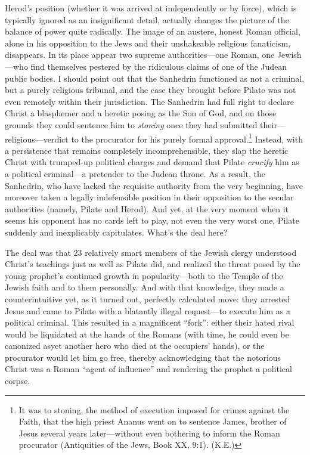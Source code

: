 Herod's position (whether it was arrived at independently or by force), which is typically ignored as an insignificant detail, actually changes the picture of the balance of power quite radically. The image of an austere, honest Roman official, alone in his opposition to the Jews and their unshakeable religious fanaticism, disappears. In its place appear two supreme authorities---one Roman, one Jewish---who find themselves pestered by the ridiculous claims of one of the Judean public bodies. I should point out that the Sanhedrin functioned as not a criminal, but a purely religious tribunal, and the case they brought before Pilate was not even remotely within their jurisdiction. The Sanhedrin had full right to declare Christ a blasphemer and a heretic posing as the Son of God, and on those grounds they could sentence him to \emph{stoning} once they had submitted their---religious---verdict to the procurator for his purely formal approval.\footnote{ It was to stoning, the method of execution imposed for crimes against the Faith, that the high priest Ananus went on to sentence James, brother of Jesus several years later---without even bothering to inform the Roman procurator (Antiquities of the Jews, Book XX, 9:1). (K.E.)} Instead, with a persistence that remains completely incomprehensible, they slap the heretic Christ with trumped-up political charges and demand that Pilate \emph{crucify} him as a political criminal---a pretender to the Judean throne. As a result, the Sanhedrin, who have lacked the requisite authority from the very beginning, have moreover taken a legally indefensible position in their opposition to the secular authorities (namely, Pilate and Herod). And yet, at the very moment when it seems his opponent has no cards left to play, not even the very worst one, Pilate suddenly and inexplicably capitulates. What's the deal here?

The deal was that 23 relatively smart members of the Jewish clergy understood Christ's teachings just as well as Pilate did, and realized the threat posed by the young prophet's continued growth in popularity---both to the Temple of the Jewish faith and to them personally. And with that knowledge, they made a counterintuitive yet, as it turned out, perfectly calculated move: they arrested Jesus and came to Pilate with a blatantly illegal request---to execute him as a political criminal. This resulted in a magnificent ``fork'': either their hated rival would be liquidated at the hands of the Romans (with time, he could even be canonized asyet another hero who died at the occupiers' hands), or the procurator would let him go free, thereby acknowledging that the notorious Christ was a Roman ``agent of influence'' and rendering the prophet a political corpse.


